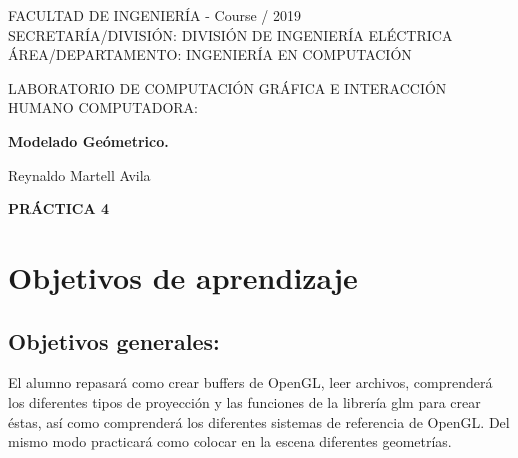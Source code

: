\documentclass[11pt, english]{article}
\makeatletter
\newcounter{unomenos}
\gdef\@date{ Course \arabic{unomenos}/ 2019}
\makeatother
\begin{document}
\begin{titlepage}
\begin{center}
FACULTAD DE INGENIERÍA - \@date\\
\vspace*{0.15in}
SECRETARÍA/DIVISIÓN: DIVISIÓN DE INGENIERÍA ELÉCTRICA \\
ÁREA/DEPARTAMENTO: INGENIERÍA EN COMPUTACIÓN \\
\vspace*{0.4in}
\begin{large}
LABORATORIO DE COMPUTACIÓN GRÁFICA E INTERACCIÓN HUMANO COMPUTADORA:\\
\end{large}
\vspace*{0.2in}
\begin{Large}
\textbf{Modelado Geómetrico.} \\
\end{Large}
\vspace*{0.3in}
\vspace*{0.3in}
\begin{large}
Reynaldo Martell Avila \\
\end{large}
\vspace*{0.5in}
\vspace*{0.5in}
\begin{large}
\textbf{PRÁCTICA 4} \\
\end{large}
\end{center}
\end{titlepage}

\newcommand{\CC}{C\nolinebreak\hspace{-.05em}\raisebox{.4ex}{\tiny\bf +}\nolinebreak\hspace{-.10em}\raisebox{.4ex}{\tiny\bf +}}
\def\CC{{C\nolinebreak[4]\hspace{-.05em}\raisebox{.4ex}{\tiny\bf ++}}}

\tableofcontents

\newpage
\section{Objetivos de aprendizaje}
\subsection{Objetivos generales:}
El alumno repasará como crear buffers de OpenGL, leer archivos, comprenderá los
diferentes tipos de proyección y las funciones de la librería glm para crear éstas, así como
comprenderá los diferentes sistemas de referencia de OpenGL. Del mismo modo practicará
como colocar en la escena diferentes geometrías.
\end{document}
